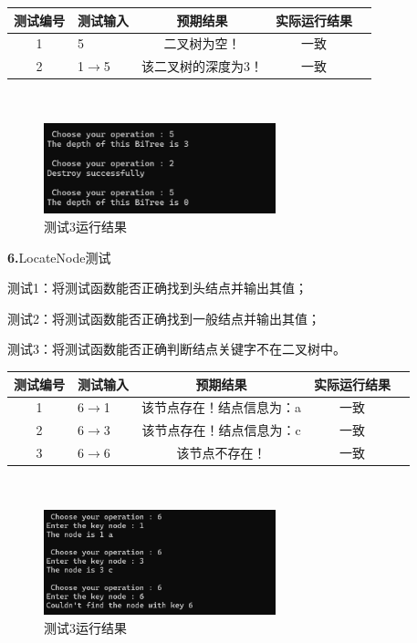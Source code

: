 \documentclass[supercite]{Experimental_Report}
\theoremstyle{definition}
\begin{document}
\begin{tabular}{|c|l|c|c|c|}
	\hline
	测试编号 & 测试输入 & 预期结果 & 实际运行结果 \\
	\hline
	1 & 5 & 二叉树为空！ & 一致 \\
	\hline
	2 & 1$\rightarrow$5 & 该二叉树的深度为3！ & 一致 \\
	\hline
\end{tabular}

~\

\begin{figure}[H]
 	\centering
 	\includegraphics[width=0.6\textwidth]{images/二叉树测试5.png}
 	\caption{测试3运行结果}
 	\label{txlab}
 \end{figure}

\noindent\textbf{ 6.}LocateNode测试 

测试1：将测试函数能否正确找到头结点并输出其值；

测试2：将测试函数能否正确找到一般结点并输出其值；

测试3：将测试函数能否正确判断结点关键字不在二叉树中。

\vspace{0.5em}

\begin{tabular}{|c|l|c|c|c|}
	\hline
	测试编号 & 测试输入 & 预期结果 & 实际运行结果 \\
	\hline
	1 & 6$\rightarrow$1 & 该节点存在！结点信息为：a & 一致 \\
	\hline
	2 & 6$\rightarrow$3 & 该节点存在！结点信息为：c & 一致 \\
	\hline
	3 & 6$\rightarrow$6 & 该节点不存在！ & 一致 \\
	\hline
\end{tabular}

~\

\begin{figure}[H]
 	\centering
 	\includegraphics[width=0.6\textwidth]{images/二叉树测试6.png}
 	\caption{测试3运行结果}
 	\label{txlab}
 \end{figure}
\end{document}
